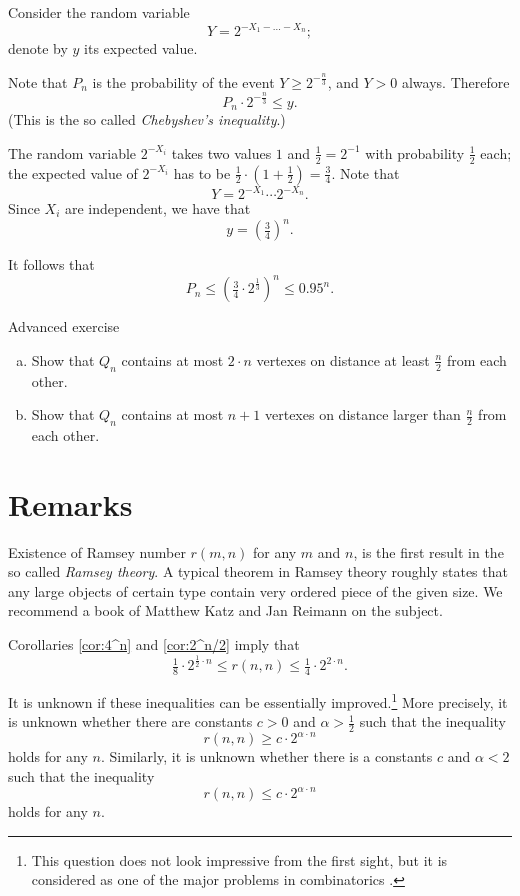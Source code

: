Consider the random variable 
\[Y=2^{-X_1-\dots-X_n};\]
denote by $y$ its expected value.

Note that $P_n$ is the probability of the event $Y\ge 2^{-\frac n3}$,
and $Y>0$ always. 
Therefore 
\[P_n\cdot 2^{-\frac n3}\le y.\]
(This is the so called \emph{Chebyshev's inequality}.)

The random variable $2^{-X_i}$ takes two values $1$ and $\tfrac12=2^{-1}$ with probability $\tfrac12$ each;
the expected value of $2^{-X_i}$ has to be $\tfrac12\cdot (1+\tfrac12)=\tfrac 34$.
Note that 
\[Y=2^{-X_1}\cdots 2^{-X_n}.\]
Since $X_i$ are independent, we have that
\[y=\left(\tfrac34\right)^n.\]

It follows that 
\[P_n\le \left(\tfrac34\cdot 2^{\frac13}\right)^n\le 0.95^n.\]
\qedsf

\begin{thm}{Advanced exercise}\label{ex:lin-Qn}
\begin{enumerate}[(a)]
\item Show that $Q_n$ contains at most $2\cdot n$ vertexes on distance at least $\tfrac n2$ from each other. 
\item Show that $Q_n$ contains at most $n+1$ vertexes on distance larger than $\tfrac n2$ from each other. 
\end{enumerate}

\end{thm}
 

\section*{Remarks}

Existence of Ramsey number $r(m,n)$ for any $m$ and $n$, is the first result in the so called \emph{Ramsey theory}. 
A typical theorem in Ramsey theory roughly states that any large objects of certain type contain very ordered piece of the given size.
We recommend a book of Matthew Katz and Jan Reimann \cite{katz-reimann} on the subject. 

Corollaries \ref{cor:4^n} and \ref{cor:2^n/2} imply that 
\[\tfrac18\cdot 2^{\frac12\cdot n}\le r(n,n)\le \tfrac14\cdot 2^{2\cdot n}.\]

It is unknown if these inequalities can be essentially improved.\footnote{This question does not look impressive from the first sight, but it is considered as one of the major problems in combinatorics \cite{gowers}.}
More precisely, it is unknown whether there are constants $c>0$ and $\alpha>\tfrac12$ such that the inequality
\[r(n,n)\ge c\cdot 2^{\alpha\cdot n}\]
holds for any $n$.
Similarly, it is unknown whether there is a constants $c$ and $\alpha<2$ such that the inequality
\[r(n,n)\le c\cdot 2^{\alpha\cdot n}\]
holds for any $n$.

